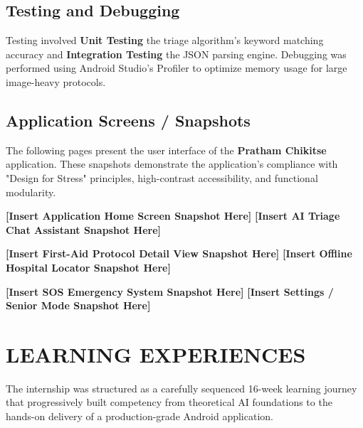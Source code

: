\documentclass[12pt,a4paper]{report}
\begin{document}
\section{Testing and Debugging}
Testing involved \textbf{Unit Testing} the triage algorithm's keyword matching accuracy and \textbf{Integration Testing} the JSON parsing engine. Debugging was performed using Android Studio's Profiler to optimize memory usage for large image-heavy protocols.

\section{Application Screens / Snapshots}

The following pages present the user interface of the \textbf{Pratham Chikitse} application. These snapshots demonstrate the application's compliance with "Design for Stress" principles, high-contrast accessibility, and functional modularity.

\vspace{1cm}

\begin{center}
    \textbf{[Insert Application Home Screen Snapshot Here]}
    \vfill
    \textbf{[Insert AI Triage Chat Assistant Snapshot Here]}
    \vfill
\end{center}

\newpage

\begin{center}
    \textbf{[Insert First-Aid Protocol Detail View Snapshot Here]}
    \vfill
    \textbf{[Insert Offline Hospital Locator Snapshot Here]}
    \vfill
\end{center}

\newpage

\begin{center}
    \textbf{[Insert SOS Emergency System Snapshot Here]}
    \vfill
    \textbf{[Insert Settings / Senior Mode Snapshot Here]}
    \vfill
\end{center}

\newpage

\chapter{LEARNING EXPERIENCES}

The internship was structured as a carefully sequenced 16-week learning journey that progressively built competency from theoretical AI foundations to the hands-on delivery of a production-grade Android application.
\end{document}
